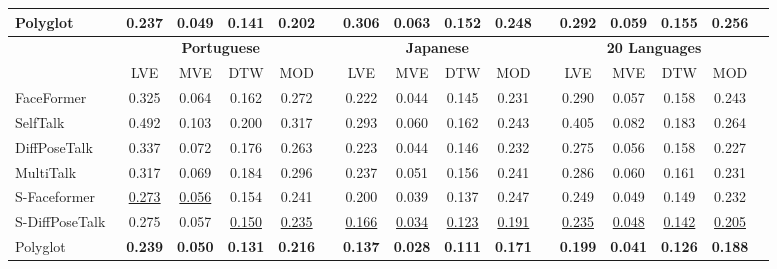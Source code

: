 \documentclass[a4paper, 10pt, conference]{ieeeconf}      %
\begin{document}
\begin{table}[h!]
{\begin{tabular}{@{}l@{\hspace{0.1cm}}ccccccccccccccc@{}}
        \midrule

        Polyglot & \textbf{0.237} & \textbf{0.049} & \textbf{0.141} & \textbf{0.202} && \textbf{0.306} & \textbf{0.063} & \textbf{0.152} & \textbf{0.248} && \textbf{0.292} & \textbf{0.059} & \textbf{0.155} & \textbf{0.256} \\
        
        \bottomrule

        & \multicolumn{4}{c}{\textbf{Portuguese}} & \phantom{abc} & \multicolumn{4}{c}{\textbf{Japanese}} &
        \phantom{abc} & \multicolumn{4}{c}{\textbf{20 Languages}} 
        \\
        \cmidrule{2-5} \cmidrule{7-10} \cmidrule{12-15} 
         & LVE  & MVE  & DTW  & MOD  && LVE  & MVE  & DTW  & MOD  && LVE  & MVE  & DTW  & MOD \\
        \midrule
        FaceFormer~\cite{Fan_Lin_Saito_Wang_Komura_faceformer_2022} & 0.325 & 0.064 & 0.162 & 0.272 && 0.222 & 0.044 & 0.145 & 0.231 && 0.290 & 0.057 & 0.158 & 0.243 \\
        
        SelfTalk~\cite{peng2023selftalk} & 0.492 & 0.103 & 0.200 & 0.317 && 0.293 & 0.060 & 0.162 & 0.243 && 0.405 & 0.082 & 0.183 & 0.264 \\

        DiffPoseTalk~\cite{sun2023diffposetalk} & 0.337 & 0.072 & 0.176 & 0.263 && 0.223 & 0.044 & 0.146 & 0.232 && 
        0.275 & 0.056 & 0.158 & 0.227 \\
        
        MultiTalk~\cite{sungbin2024multitalkenhancing3dtalking} & 0.317 & 0.069 & 0.184 & 0.296 && 0.237 & 0.051 & 0.156 & 0.241 && 0.286 & 0.060 & 0.161 & 0.231  \\
        
        \midrule

        S-Faceformer~\cite{guan2024resyncerrewiringstylebasedgenerator} & \underline{0.273} & \underline{0.056} & 0.154 & 0.241 && 0.200 & 0.039 & 0.137 & 0.247 && 0.249 & 0.049 & 0.149 & 0.232 \\

        S-DiffPoseTalk~\cite{sun2023diffposetalk} & 0.275 & 0.057 & \underline{0.150} & \underline{0.235} && \underline{0.166} & \underline{0.034} & \underline{0.123} & \underline{0.191} && \underline{0.235} & \underline{0.048} & \underline{0.142} & 
        \underline{0.205} \\
        
        \midrule

        Polyglot & \textbf{0.239} & \textbf{0.050} & \textbf{0.131} & \textbf{0.216} && \textbf{0.137} & \textbf{0.028} & \textbf{0.111} & \textbf{0.171} && \textbf{0.199} & \textbf{0.041} & \textbf{0.126} & \textbf{0.188} \\

        \bottomrule
        
        \end{tabular}
        }
        \label{tab:quantitative}
\end{table}
\end{document}
